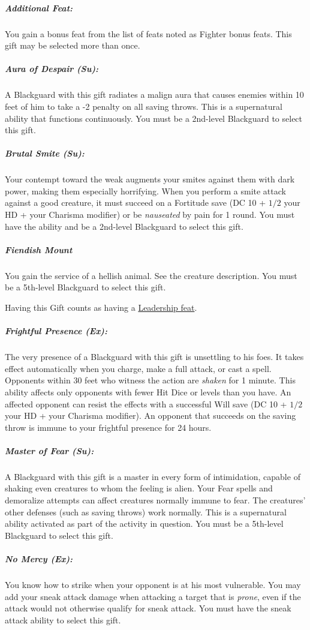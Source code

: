 \subparagraph{Additional Feat:}
You gain a bonus feat from the list of feats noted as Fighter bonus feats.
This gift may be selected more than once.

\subparagraph{Aura of Despair (Su):}
A Blackguard with this gift radiates a malign aura that causes enemies within 10 feet of him to take a -2 penalty on all saving throws. This is a supernatural ability that functions continuously. You must be a 2nd-level Blackguard to select this gift.

\subparagraph{Brutal Smite (Su):}
Your contempt toward the weak augments your smites against them with dark power, making them especially horrifying.
When you perform a smite attack against a good creature, it must succeed on a Fortitude save (DC 10 + $1/2$ your HD + your Charisma modifier) or be \emph{nauseated} by pain for 1 round. You must have the  ability and be a 2nd-level Blackguard to select this gift.

\subparagraph{Fiendish Mount}
\label{sec:FiendishMountListing}
You gain the service of a hellish animal. See the  creature description. You must be a 5th-level Blackguard to select this gift.

Having this Gift counts as having a \hyperref[sec:LeadershipFeats]{Leadership feat}.

\subparagraph{Frightful Presence (Ex):}
The very presence of a Blackguard with this gift is unsettling to his foes. 
It takes effect automatically when you charge, make a full attack, or cast a spell. 
Opponents within 30 feet who witness the action are \emph{shaken} for 1 minute.
This ability affects only opponents with fewer Hit Dice or levels than you have. 
An affected opponent can resist the effects with a successful Will save (DC 10 + $1/2$ your HD + your Charisma modifier). 
An opponent that succeeds on the saving throw is immune to your frightful presence for 24 hours.

\subparagraph{Master of Fear (Su):}
A Blackguard with this gift is a master in every form of intimidation, capable of shaking even creatures to whom the feeling is alien. Your Fear spells and demoralize attempts can affect creatures normally immune to fear. The creatures' other defenses (such as saving throws) work normally. This is a supernatural ability activated as part of the activity in question.
You must be a 5th-level Blackguard to select this gift.

\subparagraph{No Mercy (Ex):}
You know how to strike when your opponent is at his most vulnerable. You may add your sneak attack damage when attacking a target that is \emph{prone}, even if the attack would not otherwise qualify for sneak attack. You must have the sneak attack ability to select this gift.

